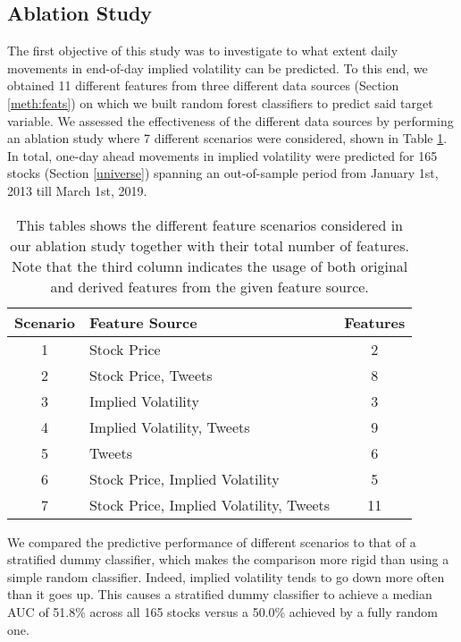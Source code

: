 \documentclass[preprint,1p, times,authoryear]{elsarticle}
\begin{document}
 
\subsection{Ablation Study}
\label{ch3:sec:abstud}
The first objective of this study was to investigate to what extent daily movements in end-of-day implied volatility can be predicted. To this end, we obtained 11 different features from three different data sources (Section \ref{meth:feats}) on which we built random forest classifiers to predict said target variable. We assessed the effectiveness of the different data sources by performing an ablation study where 7 different scenarios were considered, shown in Table \ref{tab:ablation}. In total, one-day ahead movements in implied volatility were predicted for 165 stocks (Section \ref{universe}) spanning an out-of-sample period from January 1st, 2013 till March 1st, 2019.  

\begin{table}[!ht]
 \caption{This tables shows the different feature scenarios considered in our ablation study together with their total number of features. Note that the third column indicates the usage of both original and derived features from the given feature source. } 
  \setlength{\tabcolsep}{10pt} %
  \centering
  \begin{tabular}{clc}
    \toprule
    Scenario & Feature Source & Features\\
    \midrule
    1 & Stock Price & 2 \\
    2 & Stock Price, Tweets & 8 \\
    3 & Implied Volatility & 3 \\
    4 & Implied Volatility, Tweets & 9 \\
    5 & Tweets & 6\\
    6 & Stock Price, Implied Volatility & 5 \\
    7 & Stock Price, Implied Volatility, Tweets & 11 \\
    \bottomrule
  \end{tabular}
  \label{tab:ablation}
\end{table}

We compared the predictive performance of different scenarios to that of a stratified dummy classifier, which makes the comparison more rigid than using a simple random classifier. Indeed, implied volatility tends to go down more often than it goes up. This causes a stratified dummy classifier to achieve a median AUC of 51.8\% across all 165 stocks versus a 50.0\% achieved by a fully random one. 
\end{document}
